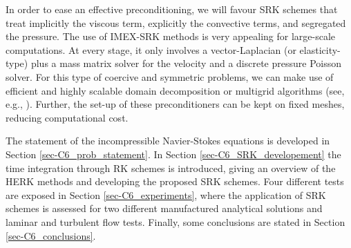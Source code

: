 In order to ease an effective preconditioning, we will favour SRK schemes that treat implicitly the viscous term, explicitly the convective terms, and segregated the pressure. The use of IMEX-SRK methods is very appealing for large-scale computations. At every stage, it only involves a vector-Laplacian (or elasticity-type) plus a mass matrix solver for the velocity and a discrete pressure Poisson solver. For this type of coercive and symmetric problems, we can make use of efficient and highly scalable domain decomposition or multigrid algorithms (see, e.g., \cite{art003}). Further, the set-up of these preconditioners can be kept on fixed meshes, reducing computational cost. 

The statement of the incompressible Navier-Stokes equations is developed in Section \ref{sec-C6_prob_statement}. In Section \ref{sec-C6_SRK_developement} the time integration through RK schemes is introduced, giving an overview of the HERK methods and developing the proposed SRK schemes. Four different tests are exposed in Section \ref{sec-C6_experiments}, where the application of SRK schemes is assessed for two different manufactured analytical solutions and laminar and turbulent flow tests. Finally, some conclusions are stated in Section \ref{sec-C6_conclusions}.


